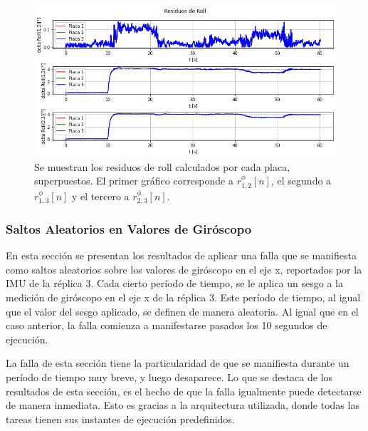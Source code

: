 \begin{figure}[H]
    \centering
    \includegraphics[width=\textwidth]{img/resultados_residuos_roll_bias_giroscopo.png}
    \caption{Se muestran los residuos de roll calculados por cada placa, superpuestos. El primer gráfico corresponde a $r_{1,2}^{\phi}[n]$, el segundo a $r_{1,3}^{\phi}[n]$ y el tercero a $r_{2,3}^{\phi}[n]$.}
    \label{fig:resultados_residuos_roll_bias_giroscopo}
\end{figure}


\subsubsection{Saltos Aleatorios en Valores de Giróscopo}

En esta sección se presentan los resultados de aplicar una falla que se manifiesta como saltos aleatorios sobre los valores de giróscopo en el eje x, reportados por la IMU de la réplica 3. Cada cierto período de tiempo, se le aplica un sesgo a la medición de giróscopo en el eje x de la réplica 3. Este período de tiempo, al igual que el valor del sesgo aplicado, se definen de manera aleatoria. Al igual que en el caso anterior, la falla comienza a manifestarse pasados los 10 segundos de ejecución.

La falla de esta sección tiene la particularidad de que se manifiesta durante un período de tiempo muy breve, y luego desaparece. Lo que se destaca de los resultados de esta sección, es el hecho de que la falla igualmente puede detectarse de manera inmediata. Esto es gracias a la arquitectura utilizada, donde todas las tareas tienen sus instantes de ejecución predefinidos.

